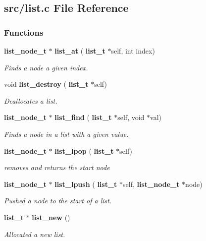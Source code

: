 \subsection{src/list.c File Reference}
\label{list_8c}
\subsubsection*{Functions}
\begin{DoxyCompactItemize}
\item 
\textbf{ list\+\_\+node\+\_\+t} $\ast$ \textbf{ list\+\_\+at} (\textbf{ list\+\_\+t} $\ast$self, int index)
\begin{DoxyCompactList}\small\item\em Finds a node a given index. \end{DoxyCompactList}\item 
void \textbf{ list\+\_\+destroy} (\textbf{ list\+\_\+t} $\ast$self)
\begin{DoxyCompactList}\small\item\em Deallocates a list. \end{DoxyCompactList}\item 
\textbf{ list\+\_\+node\+\_\+t} $\ast$ \textbf{ list\+\_\+find} (\textbf{ list\+\_\+t} $\ast$self, void $\ast$val)
\begin{DoxyCompactList}\small\item\em Finds a node in a list with a given value. \end{DoxyCompactList}\item 
\textbf{ list\+\_\+node\+\_\+t} $\ast$ \textbf{ list\+\_\+lpop} (\textbf{ list\+\_\+t} $\ast$self)
\begin{DoxyCompactList}\small\item\em removes and returns the start node \end{DoxyCompactList}\item 
\textbf{ list\+\_\+node\+\_\+t} $\ast$ \textbf{ list\+\_\+lpush} (\textbf{ list\+\_\+t} $\ast$self, \textbf{ list\+\_\+node\+\_\+t} $\ast$node)
\begin{DoxyCompactList}\small\item\em Pushed a node to the start of a list. \end{DoxyCompactList}\item 
\textbf{ list\+\_\+t} $\ast$ \textbf{ list\+\_\+new} ()
\begin{DoxyCompactList}\small\item\em Allocated a new list. \end{DoxyCompactList}\item 

\end{DoxyCompactItemize}
